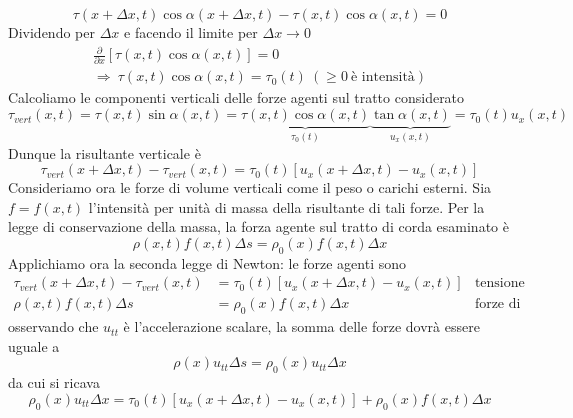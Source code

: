 \documentclass[10pt,a4paper,twoside,openright]{book}
\begin{document}
\begin{equation*}
	\tau ( x+\Delta x,t)\cos \alpha ( x+\Delta x,t) -\tau ( x,t)\cos \alpha ( x,t) =0
\end{equation*}
Dividendo per $\displaystyle \Delta x$ e facendo il limite per $\displaystyle \Delta x\rightarrow 0$
\begin{gather*}
	\frac{\partial }{\partial x}[ \tau ( x,t)\cos \alpha ( x,t)] =0\\
	\Rightarrow \ \tau ( x,t)\cos \alpha ( x,t) =\tau _{0}( t) \ \left( \geqslant 0\ \text{è intensità}\right)
\end{gather*}
Calcoliamo le componenti verticali delle forze agenti sul tratto considerato
\begin{equation*}
	\tau _{vert}( x,t) =\tau ( x,t)\sin \alpha ( x,t) =\underbrace{\tau ( x,t)\cos \alpha ( x,t)}_{\tau _{0}( t)}\underbrace{\tan \alpha ( x,t)}_{u_{x}( x,t)} =\tau _{0}( t) u_{x}( x,t)
\end{equation*}
Dunque la risultante verticale è
\begin{equation*}
	\tau _{vert}( x+\Delta x,t) -\tau _{vert}( x,t) =\tau _{0}( t)[ u_{x}( x+\Delta x,t) -u_{x}( x,t)]
\end{equation*}
Consideriamo ora le forze di volume verticali come il peso o carichi esterni. Sia $\displaystyle f=f( x,t)$ l'intensità per unità di massa della risultante di tali forze. Per la legge di conservazione della massa, la forza agente sul tratto di corda esaminato è 
\begin{equation*}
	\rho ( x,t) f( x,t) \Delta s=\rho _{0}( x) f( x,t) \Delta x
\end{equation*}
Applichiamo ora la seconda legge di Newton: le forze agenti sono
\begin{align*}
	\tau _{vert}( x+\Delta x,t) -\tau _{vert}( x,t) & =\tau _{0}( t)[ u_{x}( x+\Delta x,t) -u_{x}( x,t)] & \text{tensione}        \\
	\rho ( x,t) f( x,t) \Delta s                    & =\rho _{0}( x) f( x,t) \Delta x                    & \text{forze di volume} 
\end{align*}
osservando che $\displaystyle u_{tt}$ è l'accelerazione scalare, la somma delle forze dovrà essere uguale a
\begin{equation*}
	\rho ( x) u_{tt} \Delta s=\rho _{0}( x) u_{tt} \Delta x
\end{equation*}
da cui si ricava
\begin{equation*}
	\rho _{0}( x) u_{tt} \Delta x=\tau _{0}( t)[ u_{x}( x+\Delta x,t) -u_{x}( x,t)] +\rho _{0}( x) f( x,t) \Delta x
\end{equation*}
\end{document}
